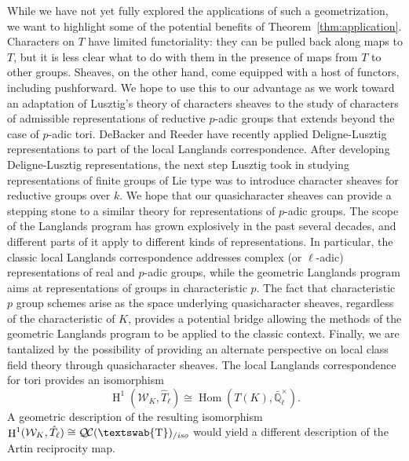 \documentclass[11pt]{amsart}
\newcommand{\mathswab}[1]{\operatorname{\textswab{#1}}}
\theoremstyle{plain}
\theoremstyle{definition}
\theoremstyle{remark}
\newcommand{\EE}{\mathbb{\bar Q}_\ell}
\newcommand{\Fq}{k}
\newcommand{\EEx}{\EE^\times}
\DeclareMathOperator{\Hom}{Hom}
\DeclareMathOperator{\Hh}{H}
\newcommand{\GN}[1]{\mathswab{#1}}
\newcommand{\QC}{{\mathcal{Q\hskip-0.8pt C}}}
\newcommand{\QCiso}[1]{\QC(#1)_{/\textit{iso}}}
\newcommand{\Weil}[1]{\mathcal{W}_{#1}}
\begin{document}
While we have not yet fully explored the applications of such a geometrization, we want to highlight
some of the potential benefits of Theorem~\ref{thm:application}. 
Characters on $T$ have limited
functoriality: they can be pulled back along maps to $T$, but it is less clear what to do with them
in the presence of maps from $T$ to other groups.  Sheaves, on the other hand, come
equipped with a host of functors, including pushforward. 
We hope to use this to our advantage as we work toward an adaptation of Lusztig's theory of characters sheaves to the study of characters of admissible representations of reductive $p$-adic groups that extends beyond the case of $p$-adic tori. 
DeBacker and Reeder have recently applied Deligne-Lusztig representations to part of the
local Langlands correspondence. %
After developing Deligne-Lusztig representations, 
the next step Lusztig took in studying representations
of finite groups of Lie type was to introduce character sheaves for reductive groups over $\Fq$.
We hope that our quasicharacter sheaves 
can provide a stepping stone to a similar theory for
representations of $p$-adic groups. 
The scope of the Langlands program has grown explosively in the past several decades, and
different parts of it apply to different kinds of representations.  In particular, the classic local Langlands
correspondence addresses complex (or $\ell$-adic) representations of real and $p$-adic groups, while
the geometric Langlands program aims at representations of groups in characteristic $p$.  The fact that
characteristic $p$ group schemes arise as the space underlying quasicharacter sheaves, regardless of
the characteristic of $K$, provides a potential bridge allowing the methods of the geometric Langlands
program to be applied to the classic context. 
Finally, we are tantalized by the possibility of providing an alternate perspective on local class field theory
through quasicharacter sheaves.  The local Langlands correspondence for tori provides an isomorphism
\[
\Hh^1(\Weil{K}, \hat{T}_\ell) \cong \Hom(T(K), \EEx).
\]
A geometric description of the resulting isomorphism $\Hh^1(\Weil{K}, \hat{T}_\ell) \cong \QCiso{\GN{T}}$
would yield a different description of the Artin reciprocity map.
\end{document}
